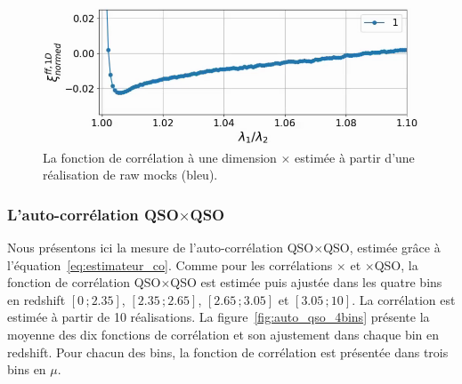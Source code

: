 \begin{figure}
  \centering
  \includegraphics[scale=0.5]{cf1d_ebossraw}
  \caption{La fonction de corrélation à une dimension \lya{}$\times$\lya{} estimée à partir d'une réalisation de raw mocks (bleu).}
  \label{fig:cf1d_ebossraw}
\end{figure}


\subsubsection{L'auto-corrélation QSO$\times$QSO}
\label{subsubsec:auto_qso}
Nous présentons ici la mesure de l'auto-corrélation QSO$\times$QSO, estimée grâce à l'équation~\ref{eq:estimateur_co}.
Comme pour les corrélations \lya{}$\times$\lya{} et \lya{}$\times$QSO, la fonction de corrélation QSO$\times$QSO est estimée puis ajustée dans les quatre bins en redshift $[\num{0}\,;\num{2.35}]$, $[\num{2.35}\,;\num{2.65}]$, $[\num{2.65}\,;\num{3.05}]$ et $[\num{3.05}\,;\num{10}]$.
La corrélation est estimée à partir de 10 réalisations.
La figure~\ref{fig:auto_qso_4bins} présente la moyenne des dix fonctions de corrélation et son ajustement dans chaque bin en redshift.
Pour chacun des bins, la fonction de corrélation est présentée dans trois bins en $\mu$. 


